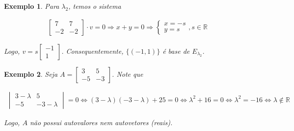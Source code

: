 \documentclass{article}
\newtheorem*{example}{Exemplo}
\begin{document}
\begin{example}
	\par\vspace{0.3cm} Para $\lambda_2$, temos o sistema
	
	\begin{align*}
	\begin{bmatrix}
	7 & 7 \\
	-2 & -2
	\end{bmatrix}\cdot v = 0 \Rightarrow x+y = 0 \Rightarrow \begin{cases}
	x = -s \\
	y = s
	\end{cases},s\in\mathbb{R}
	\end{align*}
	
	\par\vspace{0.3cm} Logo, $\displaystyle{v = s\begin{bmatrix}
		-1\\
		1
		\end{bmatrix}}$. Consequentemente, $\{ (-1,1) \}$ é base de $E_{\lambda_2}$.
	
\end{example}

\begin{example}
	Seja $A = \begin{bmatrix}
	3 & 5 \\
	-5 & -3
	\end{bmatrix}$. Note que
	
	\begin{align*}
	\begin{vmatrix}
	3 - \lambda & 5 \\
	-5 & -3-\lambda
	\end{vmatrix} = 0 \Leftrightarrow (3-\lambda)(-3-\lambda) + 25 = 0 \Leftrightarrow \lambda^2 + 16 = 0 \Leftrightarrow \lambda^2 = -16 \Leftrightarrow \lambda\notin\mathbb{R}
	\end{align*}
	
	\par\vspace{0.3cm} Logo, $A$ não possui autovalores nem autovetores (reais).
	
\end{example}
\end{document}
